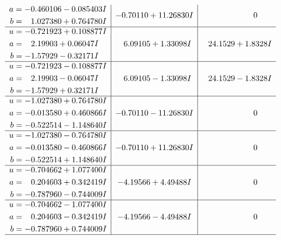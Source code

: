 \documentclass[1p]{elsarticle_modified}
\theoremstyle{definition}
\begin{document}
$$\begin{array}{c|c|c}
\begin{aligned}
a &= -0.460106 - 0.085403 I \\
b &= \phantom{-}1.027380 + 0.764780 I\end{aligned}
 & -0.70110 + 11.26830 I & \phantom{-0.000000 } 0 \\ \hline\begin{aligned}
u &= -0.721923 + 0.108877 I \\
a &= \phantom{-}2.19903 + 0.06047 I \\
b &= -1.57929 - 0.32171 I\end{aligned}
 & \phantom{-}6.09105 + 1.33098 I & \phantom{-}24.1529 + 1.8328 I \\ \hline\begin{aligned}
u &= -0.721923 - 0.108877 I \\
a &= \phantom{-}2.19903 - 0.06047 I \\
b &= -1.57929 + 0.32171 I\end{aligned}
 & \phantom{-}6.09105 - 1.33098 I & \phantom{-}24.1529 - 1.8328 I \\ \hline\begin{aligned}
u &= -1.027380 + 0.764780 I \\
a &= -0.013580 + 0.460866 I \\
b &= -0.522514 - 1.148640 I\end{aligned}
 & -0.70110 - 11.26830 I & \phantom{-0.000000 } 0 \\ \hline\begin{aligned}
u &= -1.027380 - 0.764780 I \\
a &= -0.013580 - 0.460866 I \\
b &= -0.522514 + 1.148640 I\end{aligned}
 & -0.70110 + 11.26830 I & \phantom{-0.000000 } 0 \\ \hline\begin{aligned}
u &= -0.704662 + 1.077400 I \\
a &= \phantom{-}0.204603 + 0.342419 I \\
b &= -0.787960 - 0.744009 I\end{aligned}
 & -4.19566 + 4.49488 I & \phantom{-0.000000 } 0 \\ \hline\begin{aligned}
u &= -0.704662 - 1.077400 I \\
a &= \phantom{-}0.204603 - 0.342419 I \\
b &= -0.787960 + 0.744009 I\end{aligned}
 & -4.19566 - 4.49488 I & \phantom{-0.000000 } 0\\
 \hline 
 \end{array}$$\newpage$$\begin{array}{c|c|c}  

\end{array}$$
\end{document}

